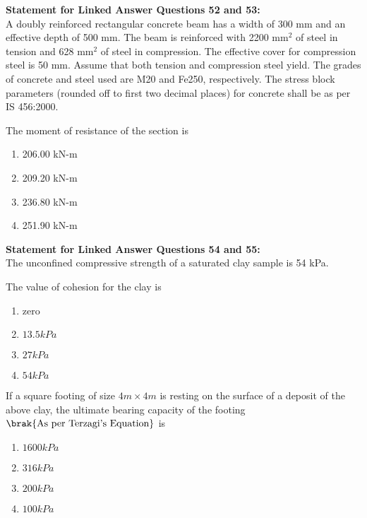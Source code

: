 \iffalse
\title{Assignment3}
\author{ee24btech11064}
\chapter{2010}
\section{ce}
\fi

\textbf{Statement for Linked Answer Questions 52 and 53:} \\
A doubly reinforced rectangular concrete beam has a width of 300 mm and an effective depth of 500 mm. The beam is reinforced with 2200 mm\(^2\) of steel in tension and 628 mm\(^2\) of steel in compression. The effective cover for compression steel is 50 mm. Assume that both tension and compression steel yield. The grades of concrete and steel used are M20 and Fe250, respectively. The stress block parameters (rounded off to first two decimal places) for concrete shall be as per IS 456:2000.
\bigskip
\item[53)] The moment of resistance of the section is
\begin{enumerate}
    \item 206.00 kN-m
    \item 209.20 kN-m
    \item 236.80 kN-m
    \item 251.90 kN-m
\end{enumerate}
\bigskip
\textbf{Statement for Linked Answer Questions 54 and 55:} \\
The unconfined compressive strength of a saturated clay sample is 54 kPa.
\bigskip
\item[54)] The value of cohesion for the clay is
\begin{multicols}{2}
\begin{enumerate}
    \item zero
    \item $13.5 kPa$
    \item $27 kPa$
    \item $54 kPa$
\end{enumerate}
\end{multicols}
\item[55)] If a square footing of size $4m\times 4m$ is resting on the surface of a deposit of the above clay, the ultimate bearing capacity of the footing$\brak{\text{As per Terzagi's Equation}}$ is
\begin{multicols}{2}
\begin{enumerate}
    \item $1600 kPa$
    \item $316kPa$
    \item $200kPa$
    \item $100 kPa$
\end{enumerate}
\end{multicols}
